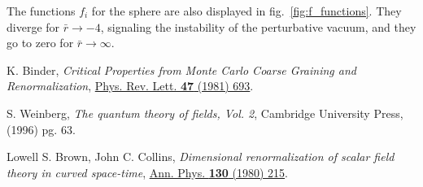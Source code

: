 \documentclass[11pt,a4paper]{article}
\begin{document}
The functions $f_i$ for the sphere are also displayed in
fig.~\ref{fig:f_functions}. They diverge for $\bar{r} \to -4$, signaling the
instability of the perturbative vacuum, and they go to zero for $\bar{r} \to
\infty$.


\begin{thebibliography}{9}
K. Binder,
\textit{Critical Properties from Monte Carlo Coarse Graining and Renormalization},
\href{https://doi.org/10.1103/PhysRevLett.47.693}{Phys. Rev. Lett. \textbf{47} (1981) 693}.

S. Weinberg,
\textit{The quantum theory of fields, Vol. 2}, Cambridge University Press, (1996) pg. 63.

Lowell S. Brown, John C. Collins,
\textit{Dimensional renormalization of scalar field theory in curved space-time},
\href{https://doi.org/10.1016/0003-4916(80)90232-8}{Ann. Phys. \textbf{130} (1980) 215}.
\end{thebibliography}
\end{document}

